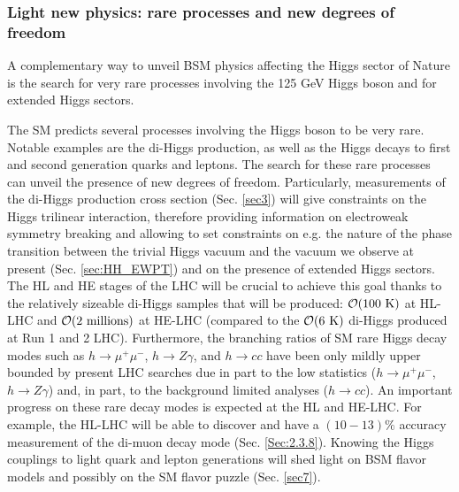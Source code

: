 \subsubsection{Light new physics: rare processes and new degrees of freedom}\label{sec:BSMintro}
A complementary way to unveil BSM physics affecting the Higgs sector of Nature is the search for very rare processes involving the 125 GeV Higgs boson and for extended Higgs sectors. 

The SM predicts several processes involving the Higgs boson to be very rare. Notable examples are the di-Higgs production, as well as the Higgs decays to first and second generation quarks and leptons. The search for these rare processes can unveil the presence of new degrees of freedom. Particularly, measurements of the di-Higgs production cross section (Sec. \ref{sec3}) will give constraints on the Higgs trilinear interaction, therefore providing information on electroweak symmetry breaking and allowing to set constraints on e.g. the nature of the phase transition between the trivial Higgs vacuum and the vacuum we observe at present (Sec. \ref{sec:HH_EWPT}) and on the presence of extended Higgs sectors. The HL and HE stages of the LHC will be crucial to achieve this goal thanks to the relatively sizeable di-Higgs samples that will be produced: $\mathcal O(100~{\rm{K}})$ at HL-LHC and $\mathcal O(2~{\rm{millions}})$ at HE-LHC (compared to the $\mathcal O(6~{\rm{K}})$ di-Higgs produced at Run 1 and 2 LHC). Furthermore, the branching ratios of SM rare Higgs decay modes such as $h\to\mu^+\mu^-$, $h\to Z\gamma$, and $h\to cc$ have been only mildly upper bounded by present LHC searches due in part to the low statistics ($h\to\mu^+\mu^-$, $h\to Z\gamma$) and, in part, to the background limited analyses ($h\to cc$). An important progress on these rare decay modes is expected at the HL and HE-LHC. For example, the HL-LHC will be able to discover and have a $(10-13)\%$ accuracy measurement of the di-muon decay mode (Sec. \ref{Sec:2.3.8}). Knowing the Higgs couplings to light quark and lepton generations will shed light on BSM flavor models and possibly on the SM flavor puzzle (Sec. \ref{sec7}).

